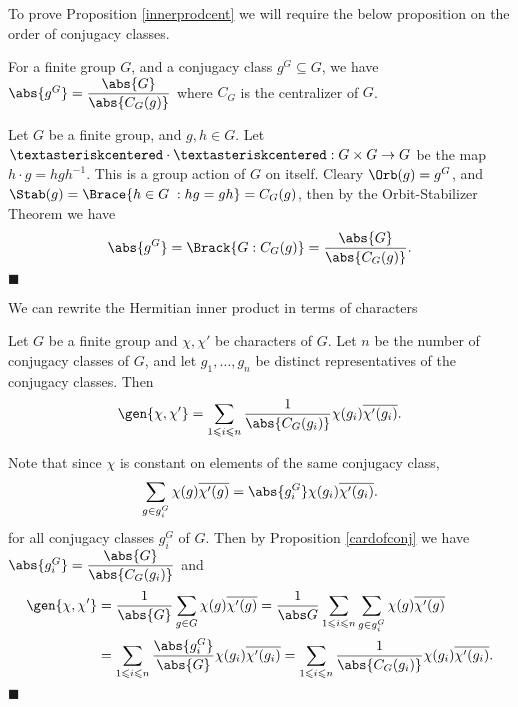 \documentclass[../Project.tex]{subfiles}
\begin{document}
To prove Proposition \ref{innerprodcent} we will require the below proposition on the order of conjugacy classes.
\begin{prop}[{\cite[Theorem 12.8]{2}}]
	\label{cardofconj}
	For a finite group $G$, and a conjugacy class $g^G \subseteq G$, we have $\abs{g^G} = \dfrac{\abs{G}}{\abs{C_G(g)}}$ where $C_G$ is the centralizer of $G$. 
\end{prop}
\begin{proo*}[{\cite[Theorem 12.8]{2}}]
	Let $G$ be a finite group, and $g,h \in G$.
	Let $\textasteriskcentered \cdot \textasteriskcentered : G \times G \to G$ be the map
	$h \cdot g = hgh^{-1}$. This is a group action of $G$ on itself. Cleary $\Orb(g) = g^G$, and $\Stab(g) = \Brace{ h \in G \;: hg = gh} = C_G(g)$, then by the Orbit-Stabilizer Theorem we have
	$$\abs{g^G} = \Brack{G : C_G(g)} = \frac{\abs{G}}{\abs{C_G(g)}}.$$
	\hfill $\blacksquare$\\
\end{proo*}

We can rewrite the Hermitian inner product in terms of characters

\begin{prop}[{\cite[Proposition 14.5 (2)]{2}}]
	\label{innerprodcent}
	Let $G$ be a finite group and $\chi,\chi'$ be characters of $G$.  Let $n$ be the number of conjugacy classes of $G$, and let $g_1,\dots,g_n$ be distinct representatives of the conjugacy classes. Then
	$$\gen{\chi,\chi'} = \sum_{1 \leqslant i \leqslant n}\frac{1}{\abs{C_G(g_i)}}\chi(g_i)\overline{\chi'(g_i)}.$$
\end{prop}
\begin{proo*}[{\cite[Proposition 14.5 (2)]{2}}]
	Note that since $\chi$ is constant on elements of the same conjugacy class,
	$$\sum_{g \in g_i^G}\chi(g)\overline{\chi'(g)} = \abs{g_i^G}\chi(g_i)\overline{\chi'(g_i)}.$$
	for all conjugacy classes $g_i^G$ of $G$.
	Then by Proposition \ref{cardofconj} we have $\abs{g_i^G} = \dfrac{\abs{G}}{\abs{C_G({g_i})}}$ and
	\begin{align*}
		\gen{\chi,\chi'} &= \frac{1}{\abs{G}}\sum_{g \in G}\chi(g)\overline{\chi'(g)} = \frac{1}{\abs G}\sum_{1 \leqslant i \leqslant n}\sum_{g \in g_i^G}\chi(g)\overline{\chi'(g)}\\
		&= \sum_{1 \leqslant i \leqslant n} \frac{\abs{g_i^G}}{\abs{G}}\chi(g_i)\overline{\chi'(g_i)}
		= \sum_{1 \leqslant i \leqslant n} \frac{1}{\abs{C_G(g_i)}}\chi(g_i)\overline{\chi'(g_i)}.
	\end{align*}
	\hfill$\blacksquare$\\
\end{proo*}
 
\end{document}
